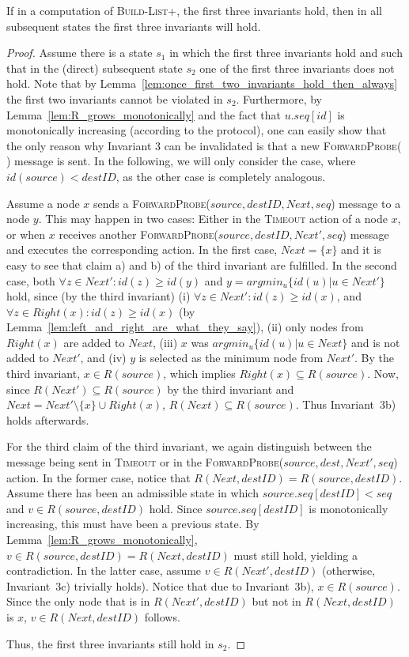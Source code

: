 \documentclass[a4paper,USenglish]{lipics}
\newcommand{\blp}{\textsc{Build-List+}\xspace}
\newcommand{\timeout}{\textsc{Timeout}\xspace}
\newcommand{\forwardprobe}[1]{\textsc{ForwardProbe(\ensuremath{#1})}\xspace}
\begin{document}
\begin{lemma}\label{lem:once_first_three_invariants_hold_then_always}
 If in a computation of \blp, the first three invariants hold, then in all subsequent states the first three invariants will hold.
\end{lemma}
\begin{proof}
  Assume there is a state $s_1$ in which the first three invariants hold and such that in the (direct) subsequent state $s_2$ one of the first three invariants does not hold.
  Note that by Lemma~\ref{lem:once_first_two_invariants_hold_then_always} the first two invariants cannot be violated in $s_2$.
  Furthermore, by Lemma~\ref{lem:R_grows_monotonically} and the fact that $u.seq[id]$ is monotonically increasing (according to the protocol), one can easily show that the only reason why Invariant 3 can be invalidated is that a new \forwardprobe{} message is sent.
  In the following, we will only consider the case, where $id(source) < destID$, as the other case is completely analogous.
  
  	Assume a node $x$ sends a \forwardprobe{source,destID,Next,seq} message to a node $y$.
	This may happen in two cases: Either in the \timeout action of a node $x$, or when $x$ receives another \forwardprobe{source,destID,Next',seq} message and executes the corresponding action.
	In the first case, $Next = \{x\}$ and it is easy to see that claim a) and b) of the third invariant are fulfilled.
	In the second case, both $\forall z \in Next': id(z) \geq id(y)$ and $y = argmin_u\{id(u) | u \in Next'\}$ hold, since (by the third invariant) (i) $\forall z \in Next': id(z) \geq id(x)$, and $\forall z \in Right(x): id(z) \geq id(x)$ (by Lemma~\ref{lem:left_and_right_are_what_they_say}), (ii) only nodes from $Right(x)$ are added to $Next$, (iii) $x$ was $argmin_u\{id(u) | u \in Next\}$ and is not added to $Next'$, and (iv) $y$ is selected as the minimum node from $Next'$. 
	By the third invariant, $x \in R(source)$, which implies $Right(x) \subseteq R(source)$.
	Now, since $R(Next') \subseteq R(source)$ by the third invariant and $Next = Next' \setminus \{x\} \cup Right(x)$, $R(Next) \subseteq R(source)$.
	Thus Invariant~3b) holds afterwards.
	
	For the third claim of the third invariant, we again distinguish between the message being sent in \timeout or in the \forwardprobe{source,dest,Next',seq} action.
	In the former case, notice that $R(Next,destID) = R(source,destID)$.
	Assume there has been an admissible state in which $source.seq[destID] < seq$ and $v \in R(source,destID)$ hold.
	Since $source.seq[destID]$ is monotonically increasing, this must have been a previous state.
	By Lemma~\ref{lem:R_grows_monotonically}, $v \in R(source,destID) = R(Next,destID)$ must still hold, yielding a contradiction.
	In the latter case, assume $v \in R(Next',destID)$ (otherwise, Invariant~3c) trivially holds).
	Notice that due to Invariant~3b), $x \in R(source)$.
	Since the only node that is in $R(Next',destID)$ but not in $R(Next,destID)$ is $x$, $v\in R(Next,destID)$ follows.
	
  Thus, the first three invariants still hold in $s_2$.
\end{proof}
\end{document}
